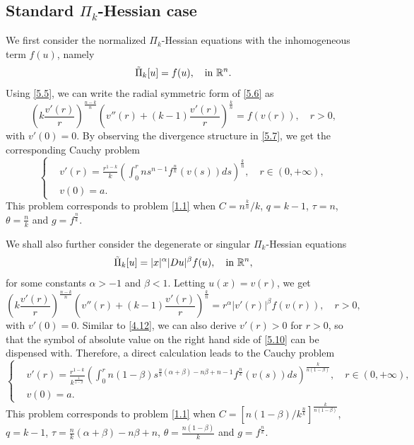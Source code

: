 \documentclass[a4paper,11pt]{amsart}
\theoremstyle{plain}
\theoremstyle{remark}
\numberwithin{equation}{section}
\numberwithin{figure}{section}
\numberwithin{remark}{section}
\begin{document}
\begin{sloppypar}
\subsection{Standard $\Pi_k$-Hessian case}\label{Section 5.1}
We first consider the normalized $\Pi_k$-Hessian equations with the inhomogeneous term $f(u)$, namely
	\begin{equation}\label{5.6}
	\tilde \Pi_k [u] = f(u), \quad {\rm in} \ \mathbb{R}^n.
	\end{equation}
Using \eqref{5.5}, we can write the radial symmetric form of \eqref{5.6} as
	\begin{equation}\label{5.7}
	\left(k\frac{v'(r)}{r}\right)^{\frac{n-k}{n}}\left(v''(r)+(k-1)\frac{v'(r)}{r}\right)^{\frac{k}{n}} = f(v(r)), \quad r>0,
	\end{equation}
with $v'(0)=0$.
By observing the divergence structure in \eqref{5.7}, we get the corresponding Cauchy problem
\begin{equation}\label{5.8}
	\left\{
	\begin{aligned}
	&v'(r)=\frac{r^{1-k}}{k} \left ( \int_{0}^{r} n s^{n-1} f^{\frac{n}{k}} (v(s))ds\right)^{\frac{k}{n}}, \quad r\in (0, +\infty), \\
	&v(0)=a.
	\end{aligned}
	\right.
	\end{equation}
	This problem corresponds to problem \eqref{1.1} when $C=n^{\frac{k}{n}}/ k$, $q=k-1$, $\tau =n$, $\theta=\frac{n}{k}$ and $g=f^{\frac{n}{k}}$.

We shall also further consider the degenerate or singular $\Pi_k$-Hessian equations
	\begin{equation}\label{5.9}
	\tilde \Pi_k [u] = |x|^\alpha |Du|^\beta f(u), \quad {\rm in} \ \mathbb{R}^n,
	\end{equation}
for some constants $\alpha>-1$ and $\beta<1$. Letting $u(x)=v(r)$, we get
	\begin{equation}\label{5.10}
	\left(k\frac{v'(r)}{r}\right)^{\frac{n-k}{n}}\left(v''(r)+(k-1)\frac{v'(r)}{r}\right)^{\frac{k}{n}} = r^\alpha |v'(r)|^\beta f(v(r)), \quad r>0,
	\end{equation}
with $v'(0)=0$. Similar to \eqref{4.12}, we can also derive $v'(r)>0$ for $r>0$, so that the symbol of absolute value on the right hand side of \eqref{5.10} can be dispensed with. Therefore, a direct calculation leads to the Cauchy problem
	\begin{equation}\label{4.13}
	\left\{
	\begin{aligned}
	&v'(r)= \frac{ r^{1-k} }{k^{\frac{1}{1-\beta}}} \left(  \int_{0}^{r} n(1-\beta) s^{\frac{n}{k}(\alpha+\beta) -n\beta+n-1} f^{\frac{n}{k}} (v(s))ds \right )^{\frac{k}{n(1-\beta)}}, \quad r\in (0, +\infty), \\
	&v(0)=a.
	\end{aligned}
	\right.
	\end{equation}
This problem corresponds to problem \eqref{1.1} when $C=\left[ n(1-\beta) / k^{\frac{n}{k}}\right]^{\frac{k}{n(1-\beta)}} $, $q=k-1$, $\tau =\frac{n}{k}(\alpha+\beta)-n\beta+n$, $\theta = \frac{n(1-\beta)}{k}$ and $g=f^{\frac{n}{k}}$.



\end{sloppypar}
\end{document}
